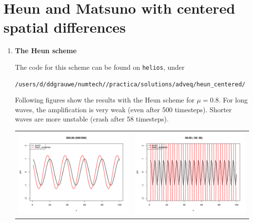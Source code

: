 \documentclass[a4paper,fleqn]{article}
\begin{document}
\section{Heun and Matsuno with centered spatial differences}
%

\begin{enumerate}
	\item \textbf{The Heun scheme}
		\par
		The code for this scheme can be found on \texttt{helios}, under
		\par
		\texttt{/users/d/ddgrauwe/numtech/\unskip/practica/solutions/adveq/heun\_centered/}
		\par
		Following figures show the results with the Heun scheme for $\mu=0.8$. For long waves, the amplification is very weak (even after 500 timesteps). Shorter waves are more unstable (crash after 58 timesteps).
		\begin{center}
			\hspace*{-50mm}
			\begin{tabular}{cc}
				\includegraphics[scale=0.3]{heun_long}	&	\includegraphics[scale=0.3]{heun_short}\\

\end{tabular}
\end{center}
\end{enumerate}
\end{document}
